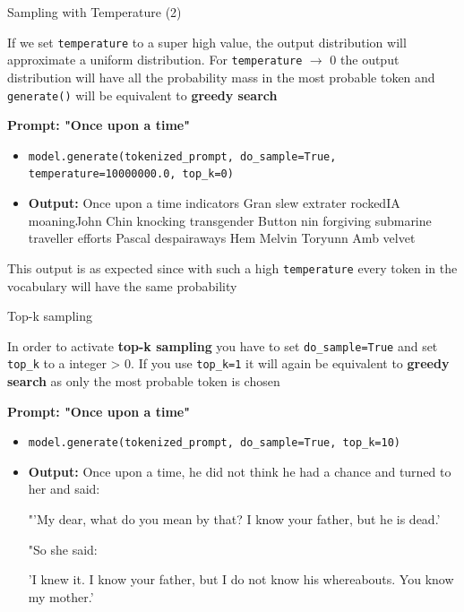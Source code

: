 \documentclass[11pt,compress,t,notes=noshow, xcolor=table]{beamer}
\begin{document}

\begin{vbframe}{Sampling with Temperature (2)}

\vfill

If we set \texttt{temperature} to a super high value, the output distribution will approximate a uniform distribution. For \texttt{temperature} $\rightarrow$ 0 the output distribution will have all the probability mass in the most probable token and \texttt{generate()} will be equivalent to \textbf{greedy search}

\textbf{Prompt: "Once upon a time"}

\begin{itemize}
    \item \texttt{model.generate(tokenized\_prompt, do\_sample=True, temperature=10000000.0, top\_k=0)}
    \item \textbf{Output:} Once upon a time indicators Gran slew extrater rockedIA moaningJohn Chin knocking transgender Button nin forgiving submarine traveller efforts Pascal despairaways Hem Melvin Toryunn Amb velvet
\end{itemize}

\vfill

This output is as expected since with such a high \texttt{temperature} every token in the vocabulary will have the same probability

\end{vbframe}

\begin{vbframe}{Top-k sampling}

\vfill

In order to activate \textbf{top-k sampling} you have to set \texttt{do\_sample=True} and set \texttt{top\_k} to a integer > 0. If you use \texttt{top\_k=1} it will again be equivalent to \textbf{greedy search} as only the most probable token is chosen

\textbf{Prompt: "Once upon a time"}

\begin{itemize}
    \item \texttt{model.generate(tokenized\_prompt, do\_sample=True, top\_k=10)}
    \item \textbf{Output:} Once upon a time, he did not think he had a chance and turned to her and said:

"'My dear, what do you mean by that? I know your father, but he is dead.'

"So she said:

'I knew it. I know your father, but I do not know his whereabouts. You know my mother.'
\end{itemize}

\vfill

\end{vbframe}
\end{document}
